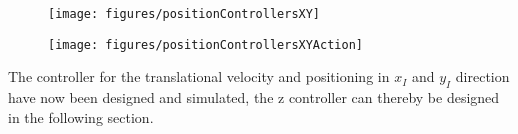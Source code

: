 \begin{minipage}{\linewidth}
    \begin{minipage}{0.46\linewidth}
        \begin{figure}[H]
            \texttt{[image: figures/positionControllersXY]}
            \centering			
            \label{fig:positionControllersXY}
        \end{figure}
    \end{minipage}
    \hspace{0.03\linewidth}
    \begin{minipage}{0.46\linewidth}
        \begin{figure}[H]
            \texttt{[image: figures/positionControllersXYAction]}
            \centering
            \label{fig:positionControllersXYAction}
        \end{figure}
    \end{minipage}
\end{minipage}

The controller for the translational velocity and positioning in $x_I$ and $y_I$ direction have now been designed and simulated, the z controller can thereby be designed in the following section.
